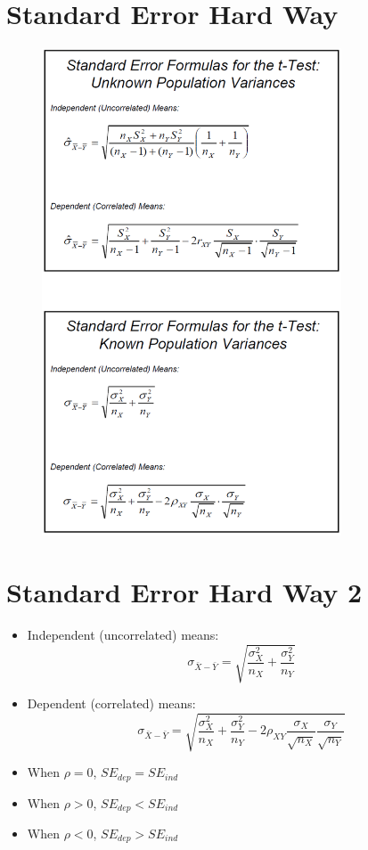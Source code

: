 \documentclass[12pt]{article}
\begin{document}
\section{Standard Error Hard Way}\label{standard-error-hard-way}

\begin{figure}[H]
\centering
\includegraphics[width=3.5in]{dep_se_hardway.png}
\caption{}
\end{figure}

\section{Standard Error Hard Way 2}\label{standard-error-hard-way-2}

\begin{itemize}
\item
  Independent (uncorrelated) means:
  \[ \sigma_{\bar{X} - \bar{Y}} = \sqrt{\frac{\sigma_{X}^{2}}{n_{X}} + \frac{\sigma_{Y}^{2}}{n_{Y}}} \]
\item
  Dependent (correlated) means:
  \[ \sigma_{\bar{X} - \bar{Y}} = \sqrt{\frac{\sigma_{X}^{2}}{n_{X}} + \frac{\sigma_{Y}^{2}}{n_{Y}} - 2 \rho_{XY} \frac{\sigma_{X}}{\sqrt{n_{X}}} \frac{\sigma_{Y}}{\sqrt{n_{Y}}}} \]
\item
  When \(\rho = 0\), \(SE_{dep} = SE_{ind}\)
\item
  When \(\rho > 0\), \(SE_{dep} < SE_{ind}\)
\item
  When \(\rho < 0\), \(SE_{dep} > SE_{ind}\)
\end{itemize}
\end{document}
